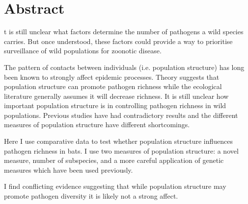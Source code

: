 \clearpage







\section{Abstract}


t is still unclear what factors determine the number of pathogens a wild species carries.
But once understood, these factors could provide a way to prioritise surveillance of wild populations for zoonotic disease.



% 

The pattern of contacts between individuals (i.e. population structure) has long been known to strongly affect epidemic processes.
Theory suggests that population structure can promote pathogen richness while the ecological literature generally assumes it will decrease richness.
It is still unclear how important population structure is in controlling pathogen richness in wild populations.
Previous studies have had contradictory results and the different measures of population structure have different shortcomings.



Here I use comparative data to test whether population structure influences pathogen richness in bats.
I use two measures of population structure: a novel measure, number of subspecies, and a more careful application of genetic measures which have been used previously.


I find conflicting evidence suggesting that while population structure may promote pathogen diversity it is likely not a strong affect.



